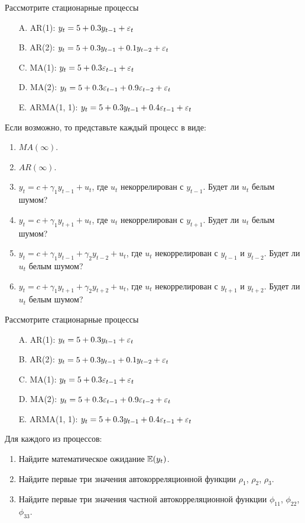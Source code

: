 \begin{problem}
Рассмотрите стационарные процессы
\begin{enumerate}
\item[A.] AR(1): $y_t = 5 + 0.3y_{t-1} + \varepsilon_t$
\item[B.] AR(2): $y_t = 5 + 0.3y_{t-1} + 0.1 y_{t-2} + \varepsilon_t$
\item[C.] MA(1): $y_t = 5 + 0.3\varepsilon_{t-1} + \varepsilon_t$
\item[D.] MA(2): $y_t = 5 + 0.3\varepsilon_{t-1} + 0.9\varepsilon_{t-2} + \varepsilon_t$
\item[E.] ARMA(1, 1): $y_t = 5 + 0.3y_{t-1} + 0.4\varepsilon_{t-1} + \varepsilon_t$
\end{enumerate}

Если возможно, то представьте каждый процесс в виде:
\begin{enumerate}
\item $MA(\infty)$.
\item $AR(\infty)$.
\item $y_t = c + \gamma_1 y_{t-1} + u_t$, где $u_t$ некоррелирован с $y_{t-1}$. Будет ли $u_t$ белым шумом?
\item $y_t = c + \gamma_1 y_{t+1} + u_t$, где $u_t$ некоррелирован с $y_{t+1}$. Будет ли $u_t$ белым шумом?
\item $y_t = c + \gamma_1 y_{t-1} + \gamma_2 y_{t-2} + u_t$, где $u_t$ некоррелирован с $y_{t-1}$ и $y_{t-2}$. Будет ли $u_t$ белым шумом?
\item $y_t = c + \gamma_1 y_{t+1} + \gamma_2 y_{t+2} + u_t$, где $u_t$ некоррелирован с $y_{t+1}$ и $y_{t+2}$. Будет ли $u_t$ белым шумом?
\end{enumerate}
\begin{sol}
\end{sol}
\end{problem}


\begin{problem}
Рассмотрите стационарные процессы
\begin{enumerate}
\item[A.] AR(1): $y_t = 5 + 0.3y_{t-1} + \varepsilon_t$
\item[B.] AR(2): $y_t = 5 + 0.3y_{t-1} + 0.1 y_{t-2} + \varepsilon_t$
\item[C.] MA(1): $y_t = 5 + 0.3\varepsilon_{t-1} + \varepsilon_t$
\item[D.] MA(2): $y_t = 5 + 0.3\varepsilon_{t-1} + 0.9\varepsilon_{t-2} + \varepsilon_t$
\item[E.] ARMA(1, 1): $y_t = 5 + 0.3y_{t-1} + 0.4\varepsilon_{t-1} + \varepsilon_t$
\end{enumerate}

Для каждого из процессов:
\begin{enumerate}
\item Найдите математическое ожидание $\operatorname{\mathbb{E}}(y_t)$.
\item Найдите первые три значения автокорреляционной функции $\rho_1$, $\rho_2$, $\rho_3$.
\item Найдите первые три значения частной автокорреляционной функции $\phi_{11}$, $\phi_{22}$, $\phi_{33}$.
\end{enumerate}
\begin{sol}
\end{sol}
\end{problem}

